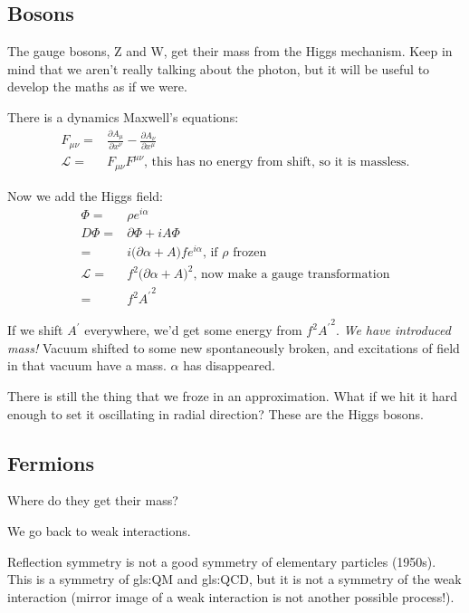 \documentclass[]{article}
\begin{document}
\subsection{Bosons}

The gauge bosons, Z and W, get their mass from the Higgs mechanism. Keep in mind that we aren't really talking about the photon, but it will be useful to develop the maths as if we were.

There is a dynamics Maxwell's equations:
\begin{align*}
	F_{\mu\nu}=&\frac{\partial A_\mu}{\partial x^\nu}-\frac{\partial A_\nu}{\partial x^\mu}\\
	\mathcal{L} =& F_{\mu\nu} F^{\mu\nu} \text{, this has no energy from shift, so it is massless.}
\end{align*}

Now we add the Higgs field:
\begin{align*}
	\Phi =& \rho e^{i \alpha}\\
	D \Phi =& \partial \Phi + i A \Phi\\
	=& i \big( \partial \alpha + A \big) f e^{i \alpha} \text{, if $\rho$ frozen}\\
	\mathcal{L} =& f^2 \big(\partial \alpha + A \big)^2 \text{, now make a gauge transformation}\\
	=& f^2 {A^\prime}^2
\end{align*}

If we shift $A^\prime$ everywhere, we'd get some energy from $f^2 {A^\prime}^2$. \emph{We have introduced mass!} Vacuum shifted to some new spontaneously broken, and excitations of field in that vacuum have a mass. $\alpha$ has disappeared.

There is still the thing that we froze in an approximation. What if we hit it hard enough to set it oscillating in radial direction? These are the Higgs bosons.
 
\subsection{Fermions}

Where do they get their mass?

We go back to weak interactions.

Reflection symmetry is not a good symmetry of elementary particles (1950s). This is a symmetry of \gls{gls:QM} and \gls{gls:QCD}, but it is not a symmetry of the weak interaction (mirror image of a weak interaction is not another possible process!). 
\end{document}
